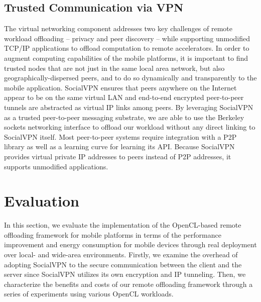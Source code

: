 \documentclass[10pt, conference, compsocconf]{IEEEtran}
\begin{document}
\subsection{Trusted Communication via VPN}
%
The virtual networking component addresses two key challenges of remote 
workload offloading -- privacy and peer discovery -- while supporting 
unmodified TCP/IP applications to offload computation to remote accelerators.
%
In order to augment computing capabilities of the mobile platforms, it is 
important to find trusted nodes that are not just in the same local area
network, but also geographically-dispersed peers, and to do so dynamically and 
transparently to the mobile application.
%
SocialVPN ensures that peers anywhere on the Internet appear to be on the
same virtual LAN and end-to-end encrypted peer-to-peer tunnels are abstracted
as virtual IP links among peers.
%
By leveraging SocialVPN as a trusted peer-to-peer messaging substrate, we
are able to use the Berkeley sockets networking interface to offload our
workload without any direct linking to SocialVPN itself.
%
Most peer-to-peer systems require integration with a P2P library as well as a 
learning curve for learning its API.
%
Because SocialVPN provides virtual private IP addresses to peers instead of
P2P addresses, it supports unmodified applications.
%
\section{Evaluation}
%
In this section, we evaluate the implementation of the OpenCL-based remote
offloading framework for mobile platforms in terms of the performance 
improvement and energy consumption for mobile devices through real deployment
over local- and wide-area environments.
%
Firstly, we examine the overhead of adopting SocialVPN to the secure 
communication between the client and the server since SocialVPN utilizes 
its own encryption and IP tunneling.
%
Then, we characterize the benefits and costs of our remote offloading 
framework through a series of experiments using various OpenCL 
workloads.
%
\end{document}
